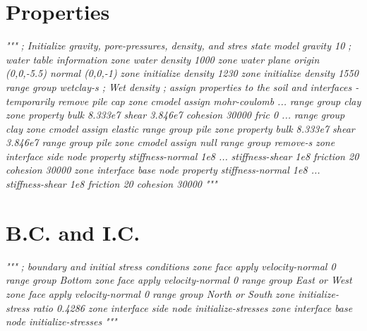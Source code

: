 \documentclass[a4paper, nobind]{templates/ociamthesis}
\newenvironment{Shaded}{\begin{snugshade}}{\end{snugshade}}
\newcommand{\CommentTok}[1]{\textcolor[rgb]{0.56,0.35,0.01}{\textit{#1}}}
\renewenvironment{Shaded}
{
  \vspace{10pt}%
  \begin{snugshade}%
}{%
  \end{snugshade}%
  \vspace{8pt}%
}
\begin{document}
\hypertarget{properties-2}{%
\section{Properties}\label{properties-2}}

\begin{Shaded}
\begin{Highlighting}[]
\CommentTok{"""}
\CommentTok{; Initialize gravity, pore{-}pressures, density, and stres state}
\CommentTok{model gravity 10}
\CommentTok{; water table information}
\CommentTok{zone water density 1000}
\CommentTok{zone water plane origin (0,0,{-}5.5) normal (0,0,{-}1)}
\CommentTok{zone initialize density 1230}
\CommentTok{zone initialize density 1550 range group \textquotesingle{}wetclay{-}s\textquotesingle{} ; Wet density}
\CommentTok{; assign properties to the soil and interfaces {-} temporarily remove pile cap}
\CommentTok{zone cmodel assign mohr{-}coulomb ...}
\CommentTok{     range group \textquotesingle{}clay\textquotesingle{}}
\CommentTok{zone property bulk 8.333e7  shear 3.846e7  cohesion 30000 fric 0 ...}
\CommentTok{     range group \textquotesingle{}clay\textquotesingle{}}
\CommentTok{zone cmodel assign elastic                 range group \textquotesingle{}pile\textquotesingle{}}
\CommentTok{zone property bulk 8.333e7  shear 3.846e7  range group \textquotesingle{}pile\textquotesingle{}}
\CommentTok{zone cmodel assign null                    range group \textquotesingle{}remove{-}s\textquotesingle{}}
\CommentTok{zone interface \textquotesingle{}side\textquotesingle{} node property stiffness{-}normal 1e8 ...}
\CommentTok{                           stiffness{-}shear 1e8 friction 20 cohesion 30000}
\CommentTok{zone interface \textquotesingle{}base\textquotesingle{} node property stiffness{-}normal 1e8 ...}
\CommentTok{                           stiffness{-}shear 1e8 friction 20 cohesion 30000}
\CommentTok{"""}
\end{Highlighting}
\end{Shaded}

\hypertarget{b.c.-and-i.c.-1}{%
\section{B.C. and I.C.}\label{b.c.-and-i.c.-1}}

\begin{Shaded}
\begin{Highlighting}[]
\CommentTok{"""}
\CommentTok{; boundary and initial stress conditions}
\CommentTok{zone face apply velocity{-}normal 0 range group \textquotesingle{}Bottom\textquotesingle{}}
\CommentTok{zone face apply velocity{-}normal 0 range group \textquotesingle{}East\textquotesingle{} or \textquotesingle{}West\textquotesingle{}}
\CommentTok{zone face apply velocity{-}normal 0 range group \textquotesingle{}North\textquotesingle{} or \textquotesingle{}South\textquotesingle{}}
\CommentTok{zone initialize{-}stress ratio 0.4286}
\CommentTok{zone interface \textquotesingle{}side\textquotesingle{} node initialize{-}stresses}
\CommentTok{zone interface \textquotesingle{}base\textquotesingle{} node initialize{-}stresses}
\CommentTok{"""}
\end{Highlighting}
\end{Shaded}
\end{document}
